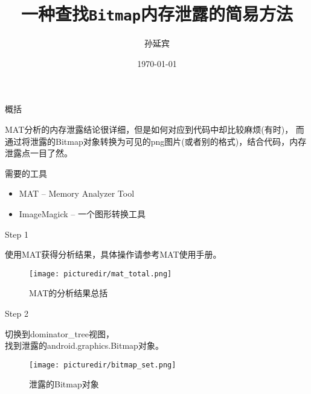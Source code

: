 ﻿\documentclass{beamer}
\title{一种查找\texttt{Bitmap}内存泄露的简易方法}
\author{孙延宾}
\institute{西安$\cdot$业务软件开发一部$\cdot$~\texttt{ZTE}}
\date{\today}
\begin{document}
  \begin{frame}[plain]
    \titlepage
  \end{frame}

  \tt

  \begin{frame}{概括}
  \begin{framedtext}
    MAT分析的内存泄露结论很详细，但是如何对应到代码中却比较麻烦(有时)，
    而通过将泄露的Bitmap对象转换为可见的png图片(或者别的格式)，结合代码，内存泄露点一目了然。
  \end{framedtext}
  \end{frame}

  \begin{frame}{需要的工具}
  \begin{framedtext}
    \begin{itemize}
      \item MAT -- Memory Analyzer Tool
      \item ImageMagick -- 一个图形转换工具
    \end{itemize}
  \end{framedtext}
  \end{frame}

  \begin{frame}{Step 1}
  \begin{framedtext}
    使用MAT获得分析结果，具体操作请参考MAT使用手册。
  \end{framedtext}
  \end{frame}

  \begin{frame}
    \begin{figure}
      \centering
      \texttt{[image: picturedir/mat\_total.png]}\\
      \caption{MAT的分析结果总括}\label{git:matresult}
    \end{figure}
  \end{frame}

  \begin{frame}{Step 2}
  \begin{framedtext}
    切换到dominator\_tree视图，\\
    找到泄露的android.graphics.Bitmap对象。
  \end{framedtext}
  \end{frame}

  \begin{frame}
    \begin{figure}
      \centering
      \texttt{[image: picturedir/bitmap\_set.png]}\\
      \caption{泄露的Bitmap对象}\label{fig:bitmap}
    \end{figure}
  \end{frame}
\end{document}

